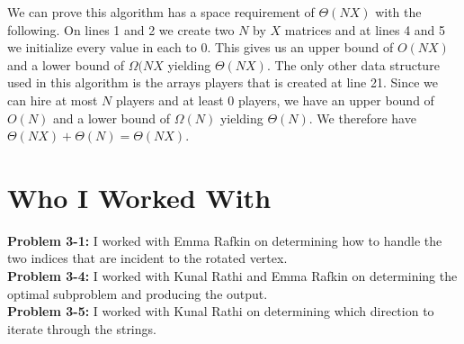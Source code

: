 \documentclass[11pt]{article}
\begin{document}
We can prove this algorithm has a space requirement of $\Theta(NX)$ with the following. On lines 1 and 2 we create two $N$ by $X$ matrices and at lines 4 and 5 we initialize every value in each to 0. This gives us an upper bound of $O(NX)$ and a lower bound of $\Omega(NX$ yielding $\Theta(NX)$. The only other data structure used in this algorithm is the arrays players that is created at line 21. Since we can hire at most $N$ players and at least 0 players, we have an upper bound of $O(N)$ and a lower bound of $\Omega(N)$ yielding $\Theta(N)$. We therefore have $\Theta(NX) + \Theta(N) = \Theta(NX)$.

\newpage

\section{Who I Worked With}

\textbf{Problem 3-1:} I worked with Emma Rafkin on determining how to handle the two indices that are incident to the rotated vertex.\\
\textbf{Problem 3-4:} I worked with Kunal Rathi and Emma Rafkin on determining the optimal subproblem and producing the output.\\
\textbf{Problem 3-5:} I worked with Kunal Rathi on determining which direction to iterate through the strings.\\
\end{document}
